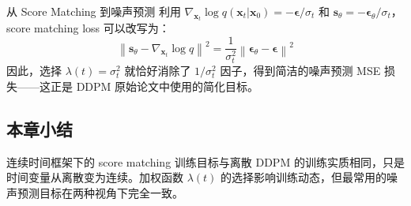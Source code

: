 \begin{knowledgebox}{从 Score Matching 到噪声预测}
利用 $\nabla_{\mathbf{x}_t}\log q(\mathbf{x}_t|\mathbf{x}_0) = -\boldsymbol{\epsilon}/\sigma_t$ 和 $\mathbf{s}_\theta = -\boldsymbol{\epsilon}_\theta / \sigma_t$，score matching loss 可以改写为：
$$
\left\|\mathbf{s}_\theta - \nabla_{\mathbf{x}_t}\log q\right\|^2 = \frac{1}{\sigma_t^2}\left\|\boldsymbol{\epsilon}_\theta - \boldsymbol{\epsilon}\right\|^2
$$
因此，选择 $\lambda(t) = \sigma_t^2$ 就恰好消除了 $1/\sigma_t^2$ 因子，得到简洁的噪声预测 MSE 损失——这正是 DDPM 原始论文中使用的简化目标。
\end{knowledgebox}

\subsection{本章小结}

连续时间框架下的 score matching 训练目标与离散 DDPM 的训练实质相同，只是时间变量从离散变为连续。加权函数 $\lambda(t)$ 的选择影响训练动态，但最常用的噪声预测目标在两种视角下完全一致。


